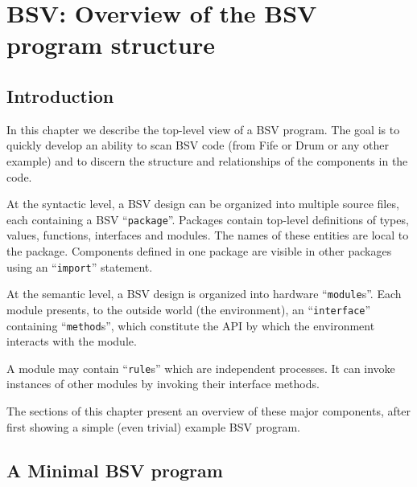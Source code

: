

\chapter{BSV: Overview of the BSV program structure}


\setcounter{page}{1}
\renewcommand{\thepage}{\arabic{chapter}-\arabic{page}}

\label{ch_Packages}


\section{Introduction}

In this chapter we describe the top-level view of a BSV program.  The
goal is to quickly develop an ability to scan BSV code (from Fife or
Drum or any other example) and to discern the structure and
relationships of the components in the code.

At the syntactic level, a BSV design can be organized into multiple
source files, each containing a BSV ``\verb|package|''.  Packages
contain top-level definitions of types, values, functions, interfaces
and modules.  The names of these entities are local to the package.
Components defined in one package are visible in other packages using
an ``\verb|import|'' statement.

At the semantic level, a BSV design is organized into hardware
``\verb|module|s''.  Each module presents, to the outside world (the
environment), an ``\verb|interface|'' containing ``\verb|method|s'',
which constitute the API by which the environment interacts with the
module.

A module may contain ``\verb|rule|s'' which are independent processes.
It can invoke instances of other modules by invoking their interface
methods.

The sections of this chapter present an overview of these major
components, after first showing a simple (even trivial) example BSV
program.


\section{A Minimal BSV program}

